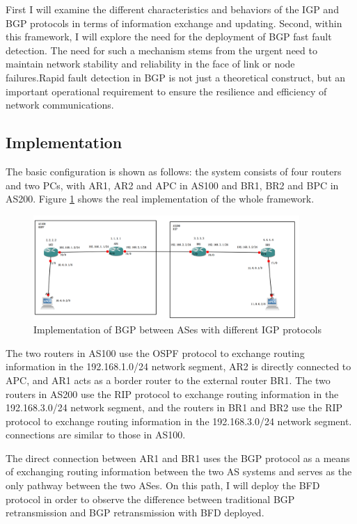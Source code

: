 \documentclass[12pt]{article}
\begin{document}
First I will examine the different characteristics and behaviors of the IGP and BGP protocols in terms of information exchange and updating. Second, within this framework, I will explore the need for the deployment of BGP fast fault detection. The need for such a mechanism stems from the urgent need to maintain network stability and reliability in the face of link or node failures.Rapid fault detection in BGP is not just a theoretical construct, but an important operational requirement to ensure the resilience and efficiency of network communications.


\subsection{Implementation}
The basic configuration is shown as follows: the system consists of four routers and two PCs, with AR1, AR2 and APC in AS100 and BR1, BR2 and BPC in AS200. Figure \ref{fig:Implementation of BGP between ASes with different IGP protocols} shows the real implementation of the whole framework. 

\begin{figure}[h]
    \centering
    \includegraphics[width=0.9\textwidth,keepaspectratio]{Graph/BGP in different ASes.png}
    \caption{Implementation of BGP between ASes with different IGP protocols} 
    \label{fig:Implementation of BGP between ASes with different IGP protocols} 
\end{figure}

The two routers in AS100 use the OSPF protocol to exchange routing information in the 192.168.1.0/24 network segment, AR2 is directly connected to APC, and AR1 acts as a border router to the external router BR1. The two routers in AS200 use the RIP protocol to exchange routing information in the 192.168.3.0/24 network segment, and the routers in BR1 and BR2 use the RIP protocol to exchange routing information in the 192.168.3.0/24 network segment. connections are similar to those in AS100.

The direct connection between AR1 and BR1 uses the BGP protocol as a means of exchanging routing information between the two AS systems and serves as the only pathway between the two ASes. On this path, I will deploy the BFD protocol in order to observe the difference between traditional BGP retransmission and BGP retransmission with BFD deployed.
\end{document}
